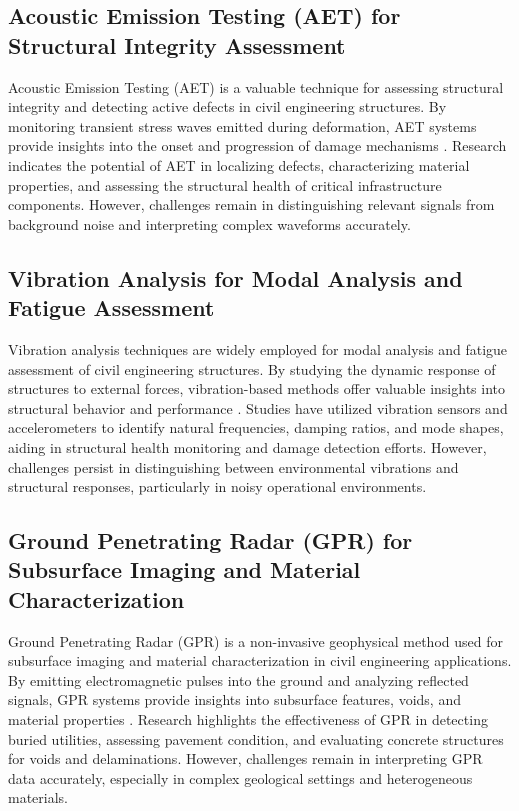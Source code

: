 \documentclass[journal, a4paper]{IEEEtran}
\begin{document}
\subsection{Acoustic Emission Testing (AET) for Structural Integrity Assessment}
Acoustic Emission Testing (AET) is a valuable technique for assessing structural integrity and detecting active defects
in civil engineering structures. By monitoring transient stress waves emitted during deformation, AET systems provide
insights into the onset and progression of damage mechanisms
\cite{katunin_modeling_2021} \cite{zhang_spatial_2023} \cite{li_physics-informed_2023}. Research indicates the potential of AET
in localizing defects, characterizing material properties, and assessing the structural health of critical infrastructure
components. However, challenges remain in distinguishing relevant signals from background noise and interpreting complex
waveforms accurately.

\subsection{Vibration Analysis for Modal Analysis and Fatigue Assessment}
Vibration analysis techniques are widely employed for modal analysis and fatigue assessment of civil engineering structures.
By studying the dynamic response of structures to external forces, vibration-based methods offer valuable insights into structural
behavior and performance \cite{carcione_demodulation_2020} \cite{de_sa_rodrigues_probability_2023} \cite{zhang_defect_2020}. Studies have utilized vibration sensors and accelerometers to identify natural
frequencies, damping ratios, and mode shapes, aiding in structural health monitoring and damage detection efforts.
However, challenges persist in distinguishing between environmental vibrations and structural responses,
particularly in noisy operational environments. 

\subsection{Ground Penetrating Radar (GPR) for Subsurface Imaging and Material Characterization}
Ground Penetrating Radar (GPR) is a non-invasive geophysical method used for subsurface imaging and
material characterization in civil engineering applications. By emitting electromagnetic pulses into the
ground and analyzing reflected signals, GPR systems provide insights into subsurface features, voids,
and material properties \cite{balasubramaniam_multi_2022} \cite{tang_explainable_2023} \cite{katunin_identification_2021}.
Research highlights the effectiveness of GPR in detecting buried utilities,
assessing pavement condition, and evaluating concrete structures for voids and delaminations. However,
challenges remain in interpreting GPR data accurately, especially in complex geological settings and heterogeneous materials.
\end{document}
